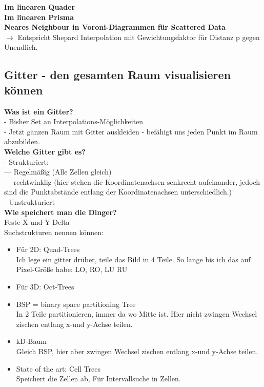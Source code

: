 \documentclass{article}
\begin{document}
\noindent \textbf{Im linearen Quader}\\

\noindent \textbf{Im linearen Prisma}\\

\noindent \textbf{Neares Neighbour in Voroni-Diagrammen für Scattered Data}\\
$\rightarrow$ Entspricht Shepard Interpolation mit Gewichtungsfaktor für Distanz p gegen Unendlich.
	
\subsection{Gitter - den gesamten Raum visualisieren können}
\noindent \textbf{Was ist ein Gitter?}\\
- Bisher Set an Interpolations-Möglichkeiten\\
- Jetzt ganzen Raum mit Gitter auskleiden - befähigt uns jeden Punkt im Raum abzubilden.\\

\noindent \textbf{Welche Gitter gibt es?}\\
- Strukturiert:\\
--- Regelmäßig (Alle Zellen gleich)\\
--- rechtwinklig (hier stehen die Koordinatenachsen senkrecht aufeinander, jedoch sind die Punktabstände entlang der Koordinatenachsen unterschiedlich.)\\
- Unstrukturiert\\

\noindent \textbf{Wie speichert man die Dinger?}\\
Feste X und Y Delta\\

\noindent Suchstrukturen nennen können:\\
\begin{itemize}[noitemsep]
	\item Für 2D:  Quad-Trees \\Ich lege ein gitter drüber, teile das Bild in 4 Teile. So lange bis ich das auf Pixel-Größe habe: LO, RO, LU RU
	\item Für 3D: Oct-Trees
	\item BSP = binary space partitioning Tree\\ In 2 Teile partitionieren, immer da wo Mitte ist. Hier nicht zwingen Wechsel zischen entlang x-und y-Achse teilen.
	\item kD-Baum\\ Gleich BSP, hier aber zwingen Wechsel zischen entlang x-und y-Achse teilen.
	\item State of the art: Cell Trees \\Speichert die Zellen ab, Für Intervallsuche in Zellen.
\end{itemize}
\end{document}
